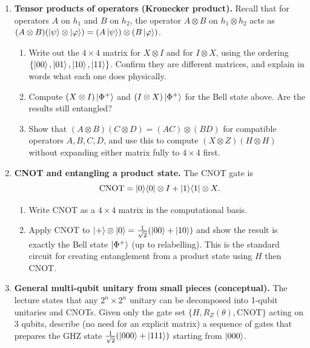 \documentclass[11pt]{article}
\begin{document}
\begin{enumerate}[label=\textbf{Exercise \arabic*.}, leftmargin=2.2cm]
\item \textbf{Tensor products of operators (Kronecker product).}
Recall that for operators $A$ on $h_1$ and $B$ on $h_2$, the operator
$A\otimes B$ on $h_1\otimes h_2$ acts as
$(A\otimes B)(\ket\psi\otimes\ket\varphi) = (A\ket\psi)\otimes(B\ket\varphi)$.
\begin{enumerate}[label=(\alph*)]
\item Write out the $4\times4$ matrix for $X\otimes I$ and for
$I\otimes X$, using the ordering $\{\ket{00},\ket{01},\ket{10},\ket{11}\}$.
Confirm they are different matrices, and explain in words what each one
does physically.
\item Compute $(X\otimes I)\ket{\Phi^+}$ and $(I\otimes X)\ket{\Phi^+}$
for the Bell state above. Are the results still entangled?
\item Show that $(A\otimes B)(C\otimes D) = (AC)\otimes(BD)$ for
compatible operators $A,B,C,D$, and use this to compute
$(X\otimes Z)(H\otimes H)$ without expanding either matrix fully to
$4\times4$ first.
\end{enumerate}

\item \textbf{CNOT and entangling a product state.}
The CNOT gate is
\[
\mathrm{CNOT} = \ket0\!\bra0\otimes I + \ket1\!\bra1\otimes X.
\]
\begin{enumerate}[label=(\alph*)]
\item Write CNOT as a $4\times4$ matrix in the computational basis.
\item Apply CNOT to $\ket+\otimes\ket0 = \tfrac1{\sqrt2}(\ket{00}+\ket{10})$
and show the result is exactly the Bell state $\ket{\Phi^+}$ (up to
relabelling). This is the standard circuit for creating entanglement
from a product state using $H$ then CNOT.
\end{enumerate}

\item \textbf{General multi-qubit unitary from small pieces (conceptual).}
The lecture states that any $2^n\times2^n$ unitary can be decomposed into
1-qubit unitaries and CNOTs. Given only the gate set $\{H, R_Z(\theta),
\mathrm{CNOT}\}$ acting on 3 qubits, describe (no need for an explicit
matrix) a sequence of gates that prepares the GHZ state
$\tfrac1{\sqrt2}(\ket{000}+\ket{111})$ starting from $\ket{000}$.

\end{enumerate}
\end{document}
